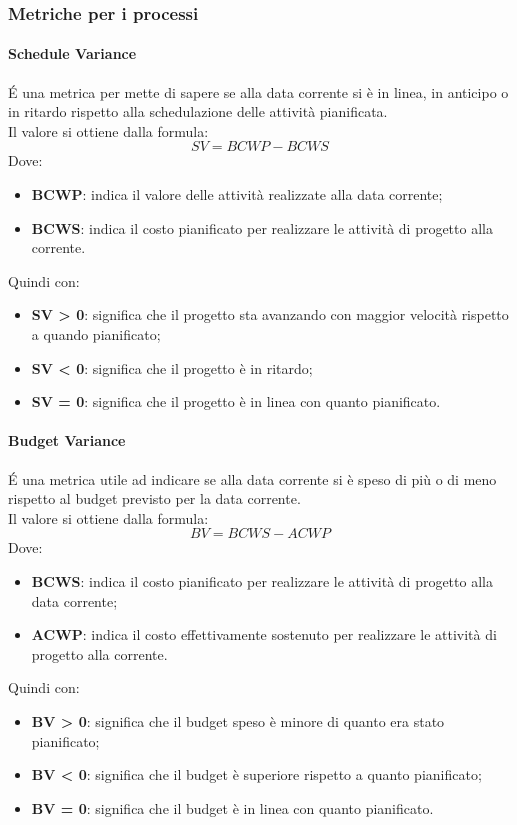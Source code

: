 \documentclass[../PianoDiQualifica.tex]{subfiles}
\begin{document}
			\subsubsection{Metriche per i processi}
				\paragraph{Schedule Variance}
				É una metrica per mette di sapere se alla data corrente si è in linea, in anticipo o in ritardo rispetto alla schedulazione delle attività pianificata.\\Il valore si ottiene dalla formula:
				\begin{equation*}
					SV = BCWP - BCWS
				\end{equation*}
				Dove:
				\begin{itemize}
					\item \textbf{BCWP}: indica il valore delle attività realizzate alla data corrente;
					\item \textbf{BCWS}: indica il costo pianificato per realizzare le attività di progetto alla corrente.
				\end{itemize}
				Quindi con:
				\begin{itemize}
					\item \textbf{SV > 0}: significa che il progetto sta avanzando con maggior velocità rispetto a quando pianificato;
					\item \textbf{SV < 0}: significa che il progetto è in ritardo;
					\item \textbf{SV = 0}: significa che il progetto è in linea con quanto pianificato.
				\end{itemize}
				\paragraph{Budget Variance}
				É una metrica utile ad indicare se alla data corrente si è speso di più o di meno rispetto al budget previsto per la data corrente.\\Il valore si ottiene dalla formula:
				\begin{equation*}
					BV = BCWS - ACWP
				\end{equation*}
				Dove:
				\begin{itemize}
					\item \textbf{BCWS}: indica il costo pianificato per realizzare le attività di progetto alla data corrente;
					\item \textbf{ACWP}: indica il costo effettivamente sostenuto per realizzare le attività di progetto alla corrente.
				\end{itemize}
				Quindi con:
				\begin{itemize}
					\item \textbf{BV > 0}: significa che il budget speso è minore di quanto era stato pianificato;
					\item \textbf{BV < 0}: significa che il budget è superiore rispetto a quanto pianificato;
					\item \textbf{BV = 0}: significa che il budget è in linea con quanto pianificato.
				\end{itemize}
\end{document}
